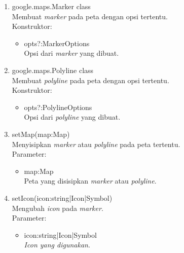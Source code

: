 \begin{enumerate}
  \item google.maps.Marker class \\
  Membuat \textit{marker} pada peta dengan opsi tertentu.\\
  Konstruktor:
  \begin{itemize}
    \item opts?:MarkerOptions\\
    Opsi dari \textit{marker} yang dibuat.
  \end{itemize}
  
  \item google.maps.Polyline class\\
  Membuat \textit{polyline} pada peta dengan opsi tertentu.\\
  Konstruktor:
  \begin{itemize}
    \item opts?:PolylineOptions\\
    Opsi dari \textit{polyline} yang dibuat.
  \end{itemize}
  
  \item setMap(map:Map)\\
  Menyisipkan \textit{marker} atau \textit{polyline} pada peta tertentu.\\
  Parameter:
  \begin{itemize}
    \item map:Map\\
    Peta yang disisipkan \textit{marker} atau \textit{polyline}.
  \end{itemize}
  
  \item setIcon(icon:string|Icon|Symbol)\\
  Mengubah \textit{icon} pada \textit{marker}.\\
  Parameter:
  \begin{itemize}
    \item icon:string|Icon|Symbol\\
    \textit{Icon yang digunakan}.
  \end{itemize}
\end{enumerate}

